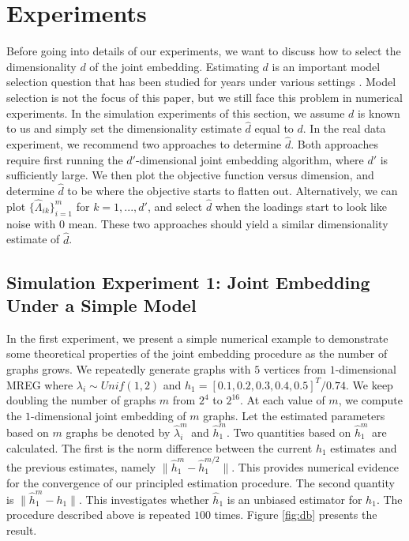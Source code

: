 \documentclass[10pt,journal,compsoc]{IEEEtran}
\begin{document}
\section{Experiments}
Before going into details of our experiments, we want to discuss how to select the dimensionality $d$ of the joint embedding. Estimating $d$ is an important model selection question that has been studied for years under various settings \cite{kohavi1995study}. Model selection is not the focus of this paper, but we still face this problem in numerical experiments. In the simulation experiments of this section, we assume $d$ is known to us and simply set the dimensionality estimate $\hat{d}$ equal to $d$. In the real data experiment, we recommend two approaches to determine $\hat{d}$. Both approaches require first running the $d'$-dimensional joint embedding algorithm, where $d'$ is sufficiently large. We then plot the objective function versus dimension, and determine $\hat{d}$ to be where the objective starts to flatten out. Alternatively, we can plot $\{\hat{\Lambda}_{ik}\}_{i=1}^m$ for $k=1,...,d'$, and select $\hat{d}$ when the loadings start to look like noise with $0$ mean. These two approaches should yield a similar dimensionality estimate of $\hat{d}$. 

\subsection{Simulation Experiment 1: Joint Embedding Under a Simple Model}
\noindent In the first experiment, we present a simple numerical example to demonstrate some theoretical properties
of the joint embedding procedure as the number of graphs grows. We repeatedly generate graphs with $5$ vertices from $1$-dimensional MREG where $\lambda_i \sim Unif(1,2)$ and $h_1=[0.1,0.2,0.3,0.4,0.5]^T/0.74$. We keep doubling the number of graphs $m$ from $2^4$ to $2^{16}$. At each value of $m$, we compute the $1$-dimensional joint embedding of $m$ graphs. Let the estimated parameters based on $m$ graphs be denoted by $\hat{\lambda}_i^m$ and $\hat{h}_1^m$. Two quantities based on $\hat{h}_1^m$ are calculated. The first is the norm difference between the current $h_1$ estimates and the previous estimates, namely $\|\hat{h}_1^m-\hat{h}_1^{m/2}\|$. This provides numerical evidence for the convergence of our principled estimation procedure. The second quantity is $\|\hat{h}^m_1-h_1\|$. This investigates whether $\hat{h}_1$ is an unbiased estimator for $h_1$. The procedure described above is repeated $100$ times. Figure \ref{fig:db} presents the result. \\
\end{document}
